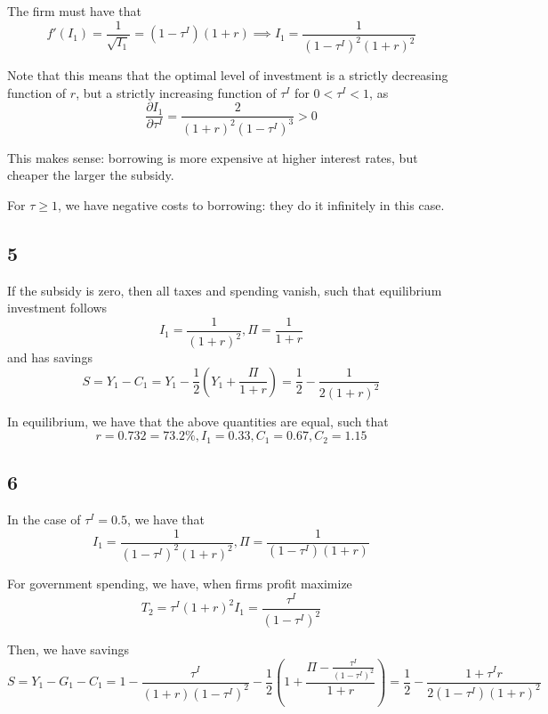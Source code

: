 \documentclass[12pt,letterpaper]{article}
\theoremstyle{definition}
\begin{document}
The firm must have that
\[
  f'(I_1) = \frac{1}{\sqrt{I_1}} = (1 - \tau^I)(1 + r) \implies I_1 =
  \frac{1}{(1 - \tau^I)^2(1 + r)^2}
\]

Note that this means that the optimal level of investment is a strictly
decreasing function of $r$, but a strictly increasing function of $\tau^I$ for
$0 < \tau^I < 1$, as
\[
  \frac{\partial I_1}{\partial \tau^I} = \frac{2}{(1 + r)^2(1 - \tau^I)^3} > 0
\]

This makes sense: borrowing is more expensive at higher interest rates, but
cheaper the larger the subsidy.

For $\tau \geq 1$, we have negative costs to borrowing: they do it
infinitely in this case.

\subsection*{5}

If the subsidy is zero, then all taxes and spending vanish, such that
equilibrium investment follows
\[
  I_1 = \frac{1}{(1+r)^2}, \Pi = \frac{1}{1 + r}
\]
and has savings
\[
  S = Y_1 - C_1 = Y_1 - \frac{1}{2}(Y_1 + \frac{\Pi}{1 + r}) = \frac{1}{2} -
  \frac{1}{2(1 + r)^2} 
\]

In equilibrium, we have that the above quantities are equal, such that
\[
  r = 0.732 = 73.2\%, I_1 = 0.33, C_1 = 0.67, C_2 = 1.15
\]

\subsection*{6}

In the case of $\tau^I = 0.5$, we have that
\[
  I_1 = \frac{1}{(1 - \tau^I)^2(1+r)^2}, \Pi = \frac{1}{(1-\tau^I)(1 + r)}
\]

For government spending, we have, when firms profit maximize
\[
  T_2 = \tau^I(1 + r)^2I_1 = \frac{\tau^I}{(1 - \tau^I)^2}
\]

Then, we have savings
\[
  S = Y_1 - G_1 - C_1 = 1 - \frac{\tau^I}{(1+r)(1-\tau^I)^2} - \frac{1}{2}(1 + \frac{\Pi -\frac{\tau^I}{(1 -
      \tau^I)^2}}{1 + r}) = \frac{1}{2} - \frac{1 + \tau^I r}{2(1-\tau^I)(1+r)^2}
\]


\end{document}
